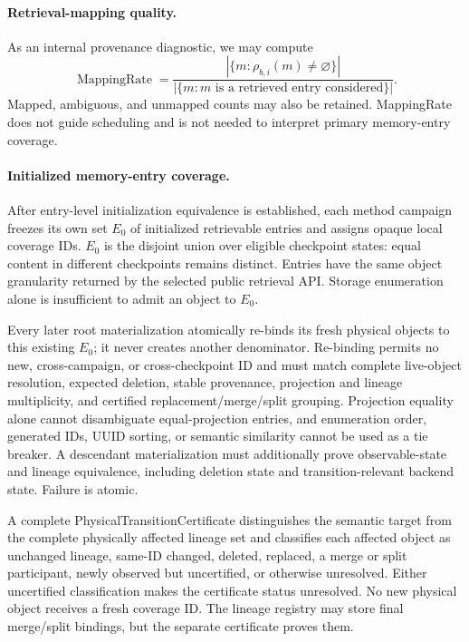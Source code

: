 \paragraph{Retrieval-mapping quality.}
As an internal provenance diagnostic, we may compute
\[
\operatorname{MappingRate}=
\frac{|\{m:\rho_{b,i}(m)\neq\varnothing\}|}
{|\{m:m\text{ is a retrieved entry considered}\}|}.
\]
Mapped, ambiguous, and unmapped counts may also be retained. MappingRate does
not guide scheduling and is not needed to interpret primary memory-entry
coverage.

\paragraph{Initialized memory-entry coverage.}
After entry-level initialization equivalence is established, each method
campaign freezes its own set \(E_0\) of initialized retrievable entries and
assigns opaque local coverage IDs. \(E_0\) is the disjoint union over eligible
checkpoint states: equal content in different checkpoints remains distinct.
Entries have the same object granularity returned by the selected public
retrieval API. Storage enumeration alone is insufficient to admit an object to
\(E_0\).

Every later root materialization atomically re-binds its fresh physical
objects to this existing \(E_0\); it never creates another denominator.
Re-binding permits no new, cross-campaign, or cross-checkpoint ID and must
match complete live-object resolution, expected deletion, stable provenance,
projection and lineage multiplicity, and certified replacement/merge/split
grouping. Projection equality alone cannot disambiguate equal-projection
entries, and enumeration order, generated IDs, UUID sorting, or semantic
similarity cannot be used as a tie breaker. A descendant materialization must
additionally prove observable-state and lineage equivalence, including
deletion state and transition-relevant backend state. Failure is atomic.

A complete PhysicalTransitionCertificate distinguishes the semantic target
from the complete physically affected lineage set and classifies each affected
object as unchanged lineage, same-ID changed, deleted, replaced, a merge or
split participant, newly observed but uncertified, or otherwise unresolved.
Either uncertified classification makes the certificate status unresolved. No
new physical object receives a fresh coverage ID. The lineage registry may
store final merge/split bindings, but the separate certificate proves them.


